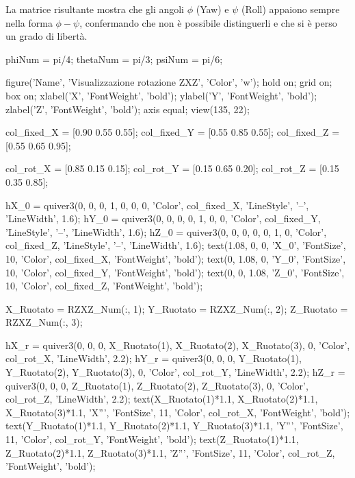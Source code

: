 \documentclass[11pt, a4paper]{article}
\begin{document}
\begin{par}
\begin{flushleft}
La matrice risultante mostra che gli angoli $\phi$ (Yaw) e  $\psi$ (Roll) appaiono sempre nella forma $\phi -\psi$, confermando che non è possibile distinguerli e che si è perso un grado di libertà.
\end{flushleft}
\end{par}


\begin{matlabcode}
phiNum = pi/4;
thetaNum = pi/3;
psiNum = pi/6;

figure('Name', 'Visualizzazione rotazione ZXZ', 'Color', 'w');
hold on;
grid on;
box on;
xlabel('X', 'FontWeight', 'bold');
ylabel('Y', 'FontWeight', 'bold');
zlabel('Z', 'FontWeight', 'bold');
axis equal;
view(135, 22);

col_fixed_X = [0.90 0.55 0.55];
col_fixed_Y = [0.55 0.85 0.55];
col_fixed_Z = [0.55 0.65 0.95];

col_rot_X = [0.85 0.15 0.15];
col_rot_Y = [0.15 0.65 0.20];
col_rot_Z = [0.15 0.35 0.85];

hX_0 = quiver3(0, 0, 0, 1, 0, 0, 0, 'Color', col_fixed_X, 'LineStyle', '--', 'LineWidth', 1.6);
hY_0 = quiver3(0, 0, 0, 0, 1, 0, 0, 'Color', col_fixed_Y, 'LineStyle', '--', 'LineWidth', 1.6);
hZ_0 = quiver3(0, 0, 0, 0, 0, 1, 0, 'Color', col_fixed_Z, 'LineStyle', '--', 'LineWidth', 1.6);
text(1.08, 0, 0, 'X_0', 'FontSize', 10, 'Color', col_fixed_X, 'FontWeight', 'bold');
text(0, 1.08, 0, 'Y_0', 'FontSize', 10, 'Color', col_fixed_Y, 'FontWeight', 'bold');
text(0, 0, 1.08, 'Z_0', 'FontSize', 10, 'Color', col_fixed_Z, 'FontWeight', 'bold');

X_Ruotato = RZXZ_Num(:, 1);
Y_Ruotato = RZXZ_Num(:, 2);
Z_Ruotato = RZXZ_Num(:, 3);

hX_r = quiver3(0, 0, 0, X_Ruotato(1), X_Ruotato(2), X_Ruotato(3), 0, 'Color', col_rot_X, 'LineWidth', 2.2);
hY_r = quiver3(0, 0, 0, Y_Ruotato(1), Y_Ruotato(2), Y_Ruotato(3), 0, 'Color', col_rot_Y, 'LineWidth', 2.2);
hZ_r = quiver3(0, 0, 0, Z_Ruotato(1), Z_Ruotato(2), Z_Ruotato(3), 0, 'Color', col_rot_Z, 'LineWidth', 2.2);
text(X_Ruotato(1)*1.1, X_Ruotato(2)*1.1, X_Ruotato(3)*1.1, 'X''', 'FontSize', 11, 'Color', col_rot_X, 'FontWeight', 'bold');
text(Y_Ruotato(1)*1.1, Y_Ruotato(2)*1.1, Y_Ruotato(3)*1.1, 'Y''', 'FontSize', 11, 'Color', col_rot_Y, 'FontWeight', 'bold');
text(Z_Ruotato(1)*1.1, Z_Ruotato(2)*1.1, Z_Ruotato(3)*1.1, 'Z''', 'FontSize', 11, 'Color', col_rot_Z, 'FontWeight', 'bold');


\end{matlabcode}
\end{document}
